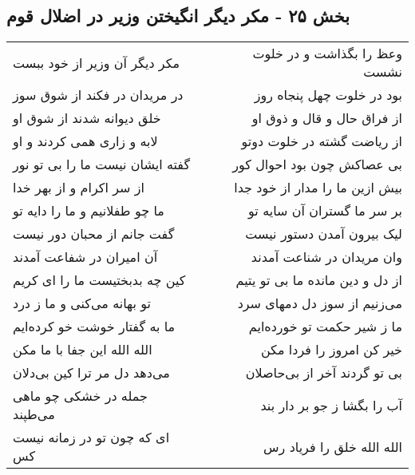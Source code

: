 \begin{center}
\section*{بخش ۲۵ - مکر دیگر انگیختن وزیر در اضلال قوم}
\label{sec:sh025}
\begin{longtable}{l p{0.5cm} r}
مکر دیگر آن وزیر از خود ببست
&&
وعظ را بگذاشت و در خلوت نشست
\\
در مریدان در فکند از شوق سوز
&&
بود در خلوت چهل پنجاه روز
\\
خلق دیوانه شدند از شوق او
&&
از فراق حال و قال و ذوق او
\\
لابه و زاری همی کردند و او
&&
از ریاضت گشته در خلوت دوتو
\\
گفته ایشان نیست ما را بی تو نور
&&
بی عصاکش چون بود احوال کور
\\
از سر اکرام و از بهر خدا
&&
بیش ازین ما را مدار از خود جدا
\\
ما چو طفلانیم و ما را دایه تو
&&
بر سر ما گستران آن سایه تو
\\
گفت جانم از محبان دور نیست
&&
لیک بیرون آمدن دستور نیست
\\
آن امیران در شفاعت آمدند
&&
وان مریدان در شناعت آمدند
\\
کین چه بدبختیست ما را ای کریم
&&
از دل و دین مانده ما بی تو یتیم
\\
تو بهانه می‌کنی و ما ز درد
&&
می‌زنیم از سوز دل دمهای سرد
\\
ما به گفتار خوشت خو کرده‌ایم
&&
ما ز شیر حکمت تو خورده‌ایم
\\
الله الله این جفا با ما مکن
&&
خیر کن امروز را فردا مکن
\\
می‌دهد دل مر ترا کین بی‌دلان
&&
بی تو گردند آخر از بی‌حاصلان
\\
جمله در خشکی چو ماهی می‌طپند
&&
آب را بگشا ز جو بر دار بند
\\
ای که چون تو در زمانه نیست کس
&&
الله الله خلق را فریاد رس
\\
\end{longtable}
\end{center}
